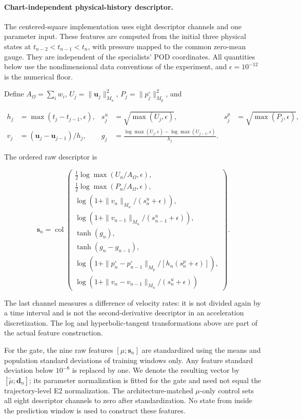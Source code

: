 \documentclass{article}
\begin{document}
\paragraph{Chart-independent physical-history descriptor.}
The centered-square implementation uses eight descriptor channels and one parameter input. These features are computed from the initial three physical states at $t_{n-2}<t_{n-1}<t_n$, with pressure mapped to the common zero-mean gauge. They are independent of the specialists' POD coordinates. All quantities below use the nondimensional data conventions of the experiment, and $\epsilon=10^{-12}$ is the numerical floor.

Define $A_\Omega=\sum_i w_i$, $U_j=\|\bm u_j\|_{M_u}^2$, $P_j=\|p_j^\circ\|_{M_p}^2$, and


\begin{align}
 h_j&=\max(t_j-t_{j-1},\epsilon),&
 s_j^u&=\sqrt{\max(U_j,\epsilon)},&
 s_j^p&=\sqrt{\max(P_j,\epsilon)},\\
 v_j&=(\bm u_j-\bm u_{j-1})/h_j,&
 g_j&=\frac{\log\max(U_j,\epsilon)-\log\max(U_{j-1},\epsilon)}{h_j}.
\end{align}


The ordered raw descriptor is


\begin{equation}
\bm s_n=\operatorname{col}\left(
\begin{array}{l}
 \tfrac12\log\max(U_n/A_\Omega,\epsilon),\\
 \tfrac12\log\max(P_n/A_\Omega,\epsilon),\\
 \log(1+\|v_n\|_{M_u}/(s_n^u+\epsilon)),\\
 \log(1+\|v_{n-1}\|_{M_u}/(s_{n-1}^u+\epsilon)),\\
 \tanh(g_n),\\
 \tanh(g_n-g_{n-1}),\\
 \log(1+\|p_n^\circ-p_{n-1}^\circ\|_{M_p}/[h_n(s_n^p+\epsilon)]),\\
 \log(1+\|v_n-v_{n-1}\|_{M_u}/(s_n^u+\epsilon))
\end{array}\right).
\label{eq:app_t2c_descriptor}
\end{equation}


The last channel measures a difference of velocity rates: it is not divided again by a time interval and is not the second-derivative descriptor in an acceleration discretization. The log and hyperbolic-tangent transformations above are part of the actual feature construction.

For the gate, the nine raw features $[\mu;\bm s_n]$ are standardized using the means and population standard deviations of training windows only. Any feature standard deviation below $10^{-8}$ is replaced by one. We denote the resulting vector by $[\widetilde\mu;\bm d_n]$; its parameter normalization is fitted for the gate and need not equal the trajectory-level E2 normalization. The architecture-matched $\mu$-only control sets all eight descriptor channels to zero after standardization. No state from inside the prediction window is used to construct these features.
\end{document}
